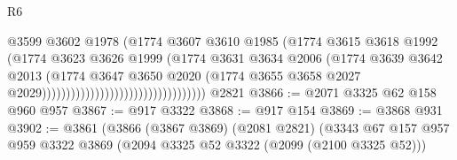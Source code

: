 \begin{lexlean}{R6}
\begin{coremodule}
                                                          @3599
                                                          @3602
                                                          @1978
                                                          (@1774
                                                            @3607
                                                            @3610
                                                            @1985
                                                            (@1774
                                                              @3615
                                                              @3618
                                                              @1992
                                                              (@1774
                                                                @3623
                                                                @3626
                                                                @1999
                                                                (@1774
                                                                  @3631
                                                                  @3634
                                                                  @2006
                                                                  (@1774
                                                                    @3639
                                                                    @3642
                                                                    @2013
                                                                    (@1774
                                                                      @3647
                                                                      @3650
                                                                      @2020
                                                                      (@1774
                                                                        @3655
                                                                        @3658
                                                                        @2027
                                                                        @2029))))))))))))))))))))))))))))))))))
    @2821
@3866 := @2071 @3325 @62 @158 @960 @957
@3867 := @917 @3322
@3868 := @917 @154
@3869 := @3868 @931
@3902 := @3861
    (@3866
      (@3867 @3869)
      (@2081 @2821)
      (@3343
        @67
        @157
        @957
        @959
        @3322
        @3869
        (@2094 @3325 @52 @3322 (@2099 (@2100 @3325 @52)))

\end{coremodule}
\end{lexlean}
